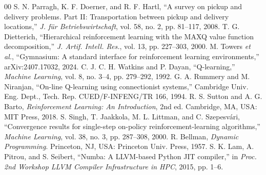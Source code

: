 \documentclass[conference]{IEEEtran}
\begin{document}
\begin{thebibliography}{00}
 S. N. Parragh, K. F. Doerner, and R. F. Hartl, ``A survey on pickup and delivery problems. Part II: Transportation between pickup and delivery locations,'' \textit{J. f\"{u}r Betriebswirtschaft}, vol. 58, no. 2, pp. 81--117, 2008.
 T. G. Dietterich, ``Hierarchical reinforcement learning with the MAXQ value function decomposition,'' \textit{J. Artif. Intell. Res.}, vol. 13, pp. 227--303, 2000.
 M. Towers \textit{et al.}, ``Gymnasium: A standard interface for reinforcement learning environments,'' arXiv:2407.17032, 2024.
 C. J. C. H. Watkins and P. Dayan, ``Q-learning,'' \textit{Machine Learning}, vol. 8, no. 3--4, pp. 279--292, 1992.
 G. A. Rummery and M. Niranjan, ``On-line Q-learning using connectionist systems,'' Cambridge Univ. Eng. Dept., Tech. Rep. CUED/F-INFENG/TR 166, 1994.
 R. S. Sutton and A. G. Barto, \textit{Reinforcement Learning: An Introduction}, 2nd ed. Cambridge, MA, USA: MIT Press, 2018.
 S. Singh, T. Jaakkola, M. L. Littman, and C. Szepesv\'{a}ri, ``Convergence results for single-step on-policy reinforcement-learning algorithms,'' \textit{Machine Learning}, vol. 38, no. 3, pp. 287--308, 2000.
 R. Bellman, \textit{Dynamic Programming}. Princeton, NJ, USA: Princeton Univ. Press, 1957.
 S. K. Lam, A. Pitrou, and S. Seibert, ``Numba: A LLVM-based Python JIT compiler,'' in \textit{Proc. 2nd Workshop LLVM Compiler Infrastructure in HPC}, 2015, pp. 1--6.
\end{thebibliography}
\end{document}
